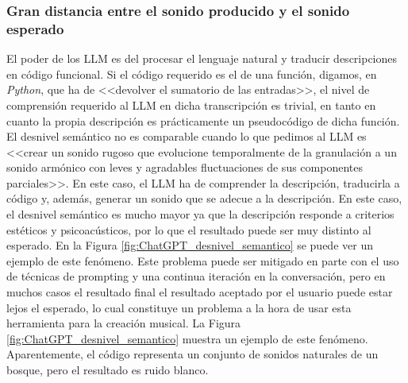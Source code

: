 \subsubsection{Gran distancia entre el sonido producido y el sonido esperado}
El poder de los LLM es del procesar el lenguaje natural y traducir descripciones en código funcional. Si el código requerido es el de una función, digamos, en \textit{Python}, que ha de <<devolver el sumatorio de las entradas>>, el nivel de comprensión requerido al LLM en dicha transcripción es trivial, en tanto en cuanto la propia descripción es prácticamente un pseudocódigo de dicha función. El desnivel semántico no es comparable cuando lo que pedimos al LLM es <<crear un sonido rugoso que evolucione temporalmente de la granulación a un sonido armónico con leves y agradables fluctuaciones de sus componentes parciales>>. En este caso, el LLM ha de comprender la descripción, traducirla a código y, además, generar un sonido que se adecue a la descripción.  En este caso, el desnivel semántico es mucho mayor ya que la descripción responde a criterios estéticos y psicoacústicos, por lo que el resultado puede ser muy distinto al esperado. En la Figura \ref{fig:ChatGPT_desnivel_semantico} se puede ver un ejemplo de este fenómeno. Este problema puede ser mitigado en parte con el uso de técnicas de prompting y una continua iteración en la conversación, pero en muchos casos el resultado final el resultado aceptado por el usuario puede estar lejos el esperado, lo cual constituye un problema a la hora de usar esta herramienta para la creación musical. La Figura \ref{fig:ChatGPT_desnivel_semantico} muestra un ejemplo de este fenómeno. Aparentemente, el código representa un conjunto de sonidos naturales de un bosque, pero el resultado es ruido blanco. 

